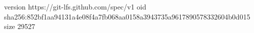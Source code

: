 version https://git-lfs.github.com/spec/v1
oid sha256:852bf1aa94131a4e08f4a7fb068aa0158a3943735a9617890578332604b0d015
size 29527
